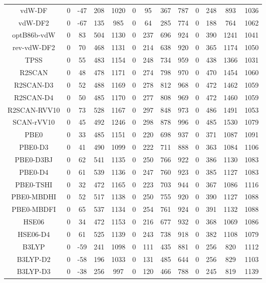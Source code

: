 \begin{table}[ht]
\begin{tabular}{ccccccccccccc}
vdW-DF & 0 & -47 & 208 & 1020 & 0 & 95 & 367 & 787 & 0 & 248 & 893 & 1036 \\ 
vdW-DF2 & 0 & -67 & 135 & 985 & 0 & 64 & 285 & 774 & 0 & 188 & 764 & 1062 \\ 
optB86b-vdW & 0 & 83 & 504 & 1130 & 0 & 237 & 696 & 924 & 0 & 390 & 1241 & 1041 \\ 
rev-vdW-DF2 & 0 & 70 & 468 & 1131 & 0 & 214 & 638 & 920 & 0 & 365 & 1174 & 1050 \\ 
TPSS & 0 & 55 & 483 & 1154 & 0 & 248 & 734 & 959 & 0 & 438 & 1366 & 1031 \\ 
R2SCAN & 0 & 48 & 478 & 1171 & 0 & 274 & 798 & 970 & 0 & 470 & 1454 & 1060 \\ 
R2SCAN-D3 & 0 & 52 & 488 & 1169 & 0 & 278 & 812 & 968 & 0 & 472 & 1462 & 1059 \\ 
R2SCAN-D4 & 0 & 50 & 485 & 1170 & 0 & 277 & 808 & 969 & 0 & 472 & 1460 & 1059 \\ 
R2SCAN-RVV10 & 0 & 73 & 528 & 1167 & 0 & 297 & 848 & 973 & 0 & 486 & 1491 & 1053 \\ 
SCAN-rVV10 & 0 & 45 & 492 & 1246 & 0 & 298 & 878 & 996 & 0 & 485 & 1530 & 1079 \\ 
PBE0 & 0 & 33 & 485 & 1151 & 0 & 220 & 698 & 937 & 0 & 371 & 1087 & 1091 \\ 
PBE0-D3 & 0 & 41 & 490 & 1099 & 0 & 222 & 711 & 888 & 0 & 363 & 1084 & 1106 \\ 
PBE0-D3BJ & 0 & 62 & 541 & 1135 & 0 & 250 & 766 & 922 & 0 & 386 & 1130 & 1083 \\ 
PBE0-D4 & 0 & 61 & 539 & 1136 & 0 & 247 & 760 & 923 & 0 & 385 & 1127 & 1083 \\ 
PBE0-TSHI & 0 & 32 & 472 & 1165 & 0 & 223 & 703 & 944 & 0 & 367 & 1086 & 1116 \\ 
PBE0-MBDHI & 0 & 52 & 517 & 1138 & 0 & 250 & 755 & 920 & 0 & 390 & 1127 & 1088 \\ 
PBE0-MBDFI & 0 & 65 & 537 & 1134 & 0 & 254 & 761 & 924 & 0 & 391 & 1132 & 1088 \\ 
HSE06 & 0 & 34 & 472 & 1153 & 0 & 216 & 677 & 932 & 0 & 368 & 1069 & 1086 \\ 
HSE06-D4 & 0 & 61 & 525 & 1139 & 0 & 243 & 738 & 918 & 0 & 382 & 1108 & 1079 \\ 
B3LYP & 0 & -59 & 241 & 1098 & 0 & 111 & 435 & 881 & 0 & 256 & 820 & 1112 \\ 
B3LYP-D2 & 0 & -58 & 196 & 1033 & 0 & 131 & 485 & 644 & 0 & 256 & 829 & 1103 \\ 
B3LYP-D3 & 0 & -38 & 256 & 997 & 0 & 120 & 466 & 788 & 0 & 245 & 819 & 1139 \\ 

\end{tabular}
\end{table}
